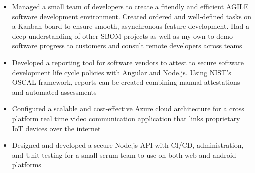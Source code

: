 

\begin{itemize}
    \item Managed a small team of developers to create a friendly and efficient AGILE software development environment. Created ordered and well-defined tasks on a Kanban board to ensure smooth, asynchronous feature development. Had a deep understanding of other SBOM projects as well as my own to demo software progress to customers and consult remote developers across teams    
    \item Developed a reporting tool for software vendors to attest to secure software development life cycle policies with Angular and Node.js. Using NIST's OSCAL framework, reports can be created combining manual attestations and automated assessments
\end{itemize}

\divider

\begin{itemize}
\item Configured a scalable and cost-effective Azure cloud architecture for a cross platform real time video communication application that links proprietary IoT devices over the internet
\item Designed and developed a secure Node.js API with CI/CD, administration, and Unit testing for a small scrum team to use on both web and android platforms 
\end{itemize}



